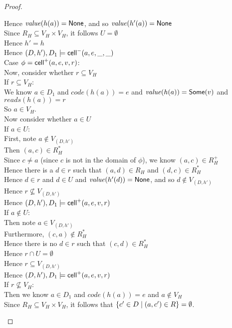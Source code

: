 \begin{proof}
\begin{tabbedproof}
\oooo Hence $\mathit{value}(h(a)) = \mathsf{None}$, and so $\mathit{value}(h'(a)) = \mathsf{None}$ \\
\oooo Since $R_H \subseteq V_H \times V_H$, it follows  $U = \emptyset$ \\
\oooo Hence $h' = h$ \\
\oooo Hence $(D,h'), D_1 \models \mathsf{cell}^{-}({a}, {e}, {\_}, {\_})$ \\
\ooo Case $\phi = \mathsf{cell}^{+}({a}, {e}, {v}, {r})$: \\
\oooo Now, consider whether $r \subseteq V_H$ \\
\oooo If $r \subseteq V_H$: \\
\ooooo We know $a \in D_1$ and $\mathit{code}(h(a)) = e$ and 
       $\mathit{value}(h(a)) = \mathsf{Some}(v)$ and $\mathit{reads}(h(a)) = r$ \\
\ooooo So $a \in V_H$. \\
\ooooo Now consider whether $a \in U$ \\
\ooooo If $a \in U$: \\
\oooooo First, note $a \not\in V_{(D,h')}$ \\
\oooooo Then $(a, c) \in R^*_H$ \\
\oooooo Since $c \not= a$ (since $c$ is not in the domain of $\phi$), we know $(a, c) \in R^+_H$ \\
\oooooo Hence there is a $d \in r$ such that $(a,d) \in R_H$ and $(d, c) \in R^*_H$  \\
\oooooo Hence $d \in r$ and $d \in U$ and $\mathit{value}(h'(d)) = \mathsf{None}$, and so $d \not\in V_{(D,h')}$\\
\oooooo Hence $r \not\subseteq V_{(D, h')}$ \\
\oooooo Hence $(D,h'), D_1 \models \mathsf{cell}^{+}({a}, {e}, {v}, {r})$ \\
\ooooo If $a \not\in U$: \\
\oooooo Then note $a \in V_{(D,h')}$ \\
\oooooo Furthermore, $(c, a) \not\in R^*_H$ \\
\oooooo Hence there is no $d \in r$ such that $(c, d) \in R^*_H$  \\
\oooooo Hence $r \cap U = \emptyset$ \\
\oooooo Hence $r \subseteq V_{(D,h')}$ \\
\oooooo Hence $(D,h'), D_1 \models \mathsf{cell}^{+}({a}, {e}, {v}, {r})$ \\
\oooo If $r \not\subseteq V_H$: \\
\ooooo Then we know $a \in D_1$ and $\mathit{code}(h(a)) = e$ and $a \not\in V_H$  \\
\ooooo Since $R_H \subseteq V_H \times V_H$, it follows that $\{{{c'\in D}\;|\;{(a,c') \in R}}\} = \emptyset$. \\

\end{tabbedproof}
\end{proof}
